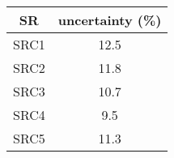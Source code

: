 \begin{tabular}{|c|c|} \hline
{\bf SR} & {\bf uncertainty (\%)} \\ \hline
SRC1 & 12.5\\ \hline
SRC2 & 11.8\\ \hline
SRC3 & 10.7\\ \hline
SRC4 & 9.5\\ \hline
SRC5 & 11.3\\ \hline
\end{tabular}

